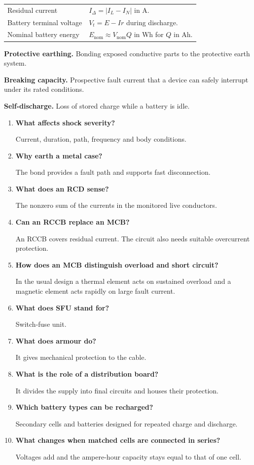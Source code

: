 \documentclass[12pt,a4paper]{article}
\newcommand{\Q}[1]{\textbf{#1}\par\noindent\ignorespaces}
\renewcommand{\arraystretch}{1.45}
\begin{document}
\begin{tcolorbox}[formulabox, title={Key Formulas and Concepts at a Glance}]
\renewcommand{\arraystretch}{1.35}
\begin{tabularx}{\linewidth}{B{4.4cm}Y}
Residual current & $I_\Delta=\lvert I_L-I_N\rvert$ in A. \\[3pt]
Battery terminal voltage & $V_t=E-Ir$ during discharge. \\[3pt]
Nominal battery energy & $E_{\mathrm{nom}}\approx V_{\mathrm{nom}}Q$ in Wh for $Q$ in Ah. \\[3pt]
\end{tabularx}
\end{tcolorbox}

\begin{tcolorbox}[defbox, title={One-Line Definitions}]
\textbf{Protective earthing.} Bonding exposed conductive parts to the protective earth system.

\textbf{Breaking capacity.} Prospective fault current that a device can safely interrupt under its rated conditions.

\textbf{Self-discharge.} Loss of stored charge while a battery is idle.
\end{tcolorbox}

\begin{tcolorbox}[exambox, title={Frequently Asked / Viva Questions}]
\begin{enumerate}[topsep=0pt, label=\textbf{Q\arabic*.}, itemsep=5pt]
  \item \Q{What affects shock severity?} Current, duration, path, frequency and body conditions.
  \item \Q{Why earth a metal case?} The bond provides a fault path and supports fast disconnection.
  \item \Q{What does an RCD sense?} The nonzero sum of the currents in the monitored live conductors.
  \item \Q{Can an RCCB replace an MCB?} An RCCB covers residual current. The circuit also needs suitable overcurrent protection.
  \item \Q{How does an MCB distinguish overload and short circuit?} In the usual design a thermal element acts on sustained overload and a magnetic element acts rapidly on large fault current.
  \item \Q{What does SFU stand for?} Switch-fuse unit.
  \item \Q{What does armour do?} It gives mechanical protection to the cable.
  \item \Q{What is the role of a distribution board?} It divides the supply into final circuits and houses their protection.
  \item \Q{Which battery types can be recharged?} Secondary cells and batteries designed for repeated charge and discharge.
  \item \Q{What changes when matched cells are connected in series?} Voltages add and the ampere-hour capacity stays equal to that of one cell.
\end{enumerate}
\end{tcolorbox}
\end{document}

